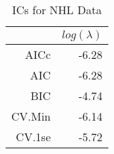 \begin{table}[ht]
\centering
\begin{tabular}{rr}
  \hline
 & $log(\lambda)$ \\ 
  \hline
AICc & -6.28 \\ 
  AIC & -6.28 \\ 
  BIC & -4.74 \\ 
  CV.Min & -6.14 \\ 
  CV.1se & -5.72 \\ 
   \hline
\end{tabular}
\caption{ICs for NHL Data} 
\label{tab:ic}
\end{table}
